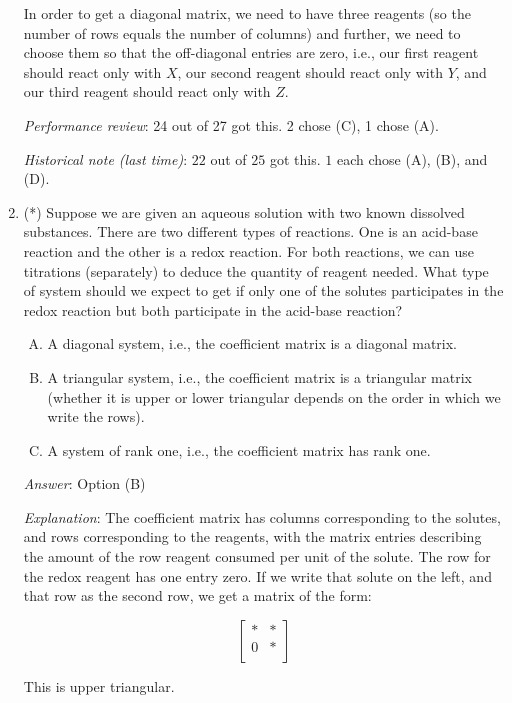 \documentclass[10pt]{amsart}
\begin{document}
\begin{enumerate}
  In order to get a diagonal matrix, we need to have three reagents
  (so the number of rows equals the number of columns) and further, we
  need to choose them so that the off-diagonal entries are zero, i.e.,
  our first reagent should react only with $X$, our second reagent
  should react only with $Y$, and our third reagent should react only
  with $Z$.

  {\em Performance review}: 24 out of 27 got this. 2 chose (C), 1 chose (A).

  {\em Historical note (last time)}: $22$ out of $25$ got this. $1$ each chose
  (A), (B), and (D).

\item (*) Suppose we are given an aqueous solution with two known
  dissolved substances. There are two different types of
  reactions. One is an acid-base reaction and the other is a redox
  reaction. For both reactions, we can use titrations (separately) to
  deduce the quantity of reagent needed. What type of system should we
  expect to get if only one of the solutes participates in the redox
  reaction but both participate in the acid-base reaction?

  \begin{enumerate}[(A)]
  \item A diagonal system, i.e., the coefficient matrix is a diagonal matrix.
  \item A triangular system, i.e., the coefficient matrix is a
    triangular matrix (whether it is upper or lower triangular depends
    on the order in which we write the rows).
  \item A system of rank one, i.e., the coefficient matrix has rank one.
  \end{enumerate}

  {\em Answer}: Option (B)

  {\em Explanation}: The coefficient matrix has columns corresponding
  to the solutes, and rows corresponding to the reagents, with the
  matrix entries describing the amount of the row reagent consumed per
  unit of the solute. The row for the redox reagent has one entry
  zero. If we write that solute on the left, and that row as the
  second row, we get a matrix of the form:

  $$\left[\begin{matrix} * & * \\ 0 & * \\\end{matrix}\right]$$

  This is upper triangular.


\end{enumerate}
\end{document}
